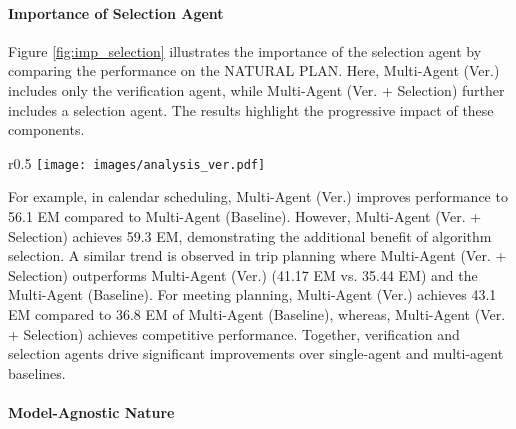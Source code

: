 \paragraph{Importance of Selection Agent}

Figure \ref{fig:imp_selection} illustrates the importance of the selection agent by comparing the performance on the NATURAL PLAN. Here, Multi-Agent (Ver.) includes only the verification agent, while Multi-Agent (Ver. + Selection) further includes a selection agent. The results highlight the progressive impact of these components. 

\begin{wrapfigure}{r}{0.5\textwidth}
    \centering
    \texttt{[image: images/analysis\_ver.pdf]}
    \caption{Case study on NATURAL PLAN, showing the impact of selection agent. Ver.: Verification.}
    \label{fig:imp_selection}
\end{wrapfigure}For example, in calendar scheduling, Multi-Agent (Ver.) improves performance to 56.1 EM compared to Multi-Agent (Baseline). However, Multi-Agent (Ver. + Selection) achieves 59.3 EM, demonstrating the additional benefit of algorithm selection. A similar trend is observed in trip planning where Multi-Agent (Ver. + Selection) outperforms Multi-Agent (Ver.) (41.17 EM vs. 35.44 EM) and the Multi-Agent (Baseline). For meeting planning, Multi-Agent (Ver.) achieves 43.1 EM compared to 36.8 EM of Multi-Agent (Baseline), whereas, Multi-Agent (Ver. + Selection) achieves competitive performance. Together, verification and selection agents drive significant improvements over single-agent and multi-agent baselines.





\paragraph{Model-Agnostic Nature}

